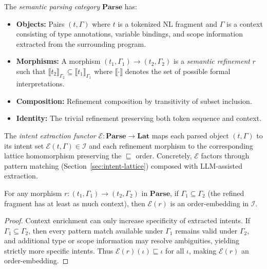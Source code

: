 \documentclass[11pt]{article}
\newcommand{\IntentLattice}{\mathcal{I}}
\begin{document}
\begin{definition}
\label{def:parse-cat}
The \emph{semantic parsing category} $\mathbf{Parse}$ has:
\begin{itemize}[noitemsep]
  \item \textbf{Objects:} Pairs $(t, \Gamma)$ where $t$ is a tokenized
        NL fragment and $\Gamma$ is a context consisting of type
        annotations, variable bindings, and scope information extracted
        from the surrounding program.
  \item \textbf{Morphisms:} A morphism $(t_1, \Gamma_1) \to (t_2,
        \Gamma_2)$ is a \emph{semantic refinement} $r$ such that
        $\llbracket t_2 \rrbracket_{\Gamma_2} \subseteq
        \llbracket t_1 \rrbracket_{\Gamma_1}$ where $\llbracket \cdot
        \rrbracket$ denotes the set of possible formal interpretations.
  \item \textbf{Composition:} Refinement composition by transitivity of
        subset inclusion.
  \item \textbf{Identity:} The trivial refinement preserving both token
        sequence and context.
\end{itemize}
\end{definition}

\begin{definition}
\label{def:intent-functor}
The \emph{intent extraction functor}
$\mathcal{E} : \mathbf{Parse} \to \mathbf{Lat}$ maps each parsed
object $(t, \Gamma)$ to its intent set
$\mathcal{E}(t, \Gamma) \in \IntentLattice$ and each refinement morphism
to the corresponding lattice homomorphism preserving the $\sqsubseteq$
order.  Concretely, $\mathcal{E}$ factors through pattern matching
(Section~\ref{sec:intent-lattice}) composed with LLM-assisted
extraction.
\end{definition}

\begin{proposition}\label{prop:parse-ctx}
For any morphism $r : (t_1, \Gamma_1) \to (t_2, \Gamma_2)$ in
$\mathbf{Parse}$, if $\Gamma_1 \subseteq \Gamma_2$ (the refined
fragment has at least as much context), then
$\mathcal{E}(r)$ is an order-embedding in $\IntentLattice$.
\end{proposition}

\begin{proof}
Context enrichment can only increase specificity of extracted intents.
If $\Gamma_1 \subseteq \Gamma_2$, then every pattern match available
under $\Gamma_1$ remains valid under $\Gamma_2$, and additional type
or scope information may resolve ambiguities, yielding strictly more
specific intents.  Thus $\mathcal{E}(r)(\iota) \sqsubseteq \iota$
for all $\iota$, making $\mathcal{E}(r)$ an order-embedding.
\end{proof}
\end{document}

